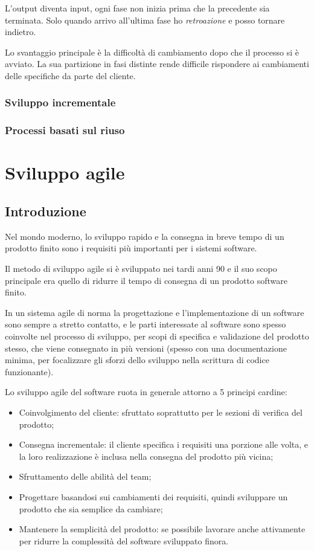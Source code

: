 \documentclass[a4paper, 10pt]{article}
\begin{document}
				L'output diventa input, ogni fase non inizia prima che la precedente sia terminata. Solo quando arrivo all'ultima fase ho \textit{retroazione} e posso tornare indietro.
				
				\noindent
				Lo svantaggio principale è la difficoltà di cambiamento dopo che il processo si è avviato.
				La sua partizione in fasi distinte rende difficile rispondere ai cambiamenti delle specifiche da parte del cliente.
				
			\subsubsection{Sviluppo incrementale}
			\subsubsection{Processi basati sul riuso}

	
	\section{Sviluppo agile}
		\subsection{Introduzione}
		Nel mondo moderno, lo sviluppo rapido e la consegna in breve tempo di un prodotto finito sono i requisiti più importanti per i sistemi software.
		
		Il metodo di sviluppo agile si è sviluppato nei tardi anni 90 e il suo scopo principale era quello di ridurre il tempo di consegna di un prodotto software finito. 
		
		In un sistema agile di norma la progettazione e l'implementazione di un software sono sempre a stretto contatto, e le parti interessate al software sono spesso coinvolte nel processo di sviluppo, per scopi di specifica e validazione del prodotto stesso, che viene consegnato in più versioni (spesso con una documentazione minima, per focalizzare gli sforzi dello sviluppo nella scrittura di codice funzionante).
		
		Lo sviluppo agile del software ruota in generale attorno a 5 principi cardine:
		\begin{itemize}
			\item Coinvolgimento del cliente: sfruttato soprattutto per le sezioni di verifica del prodotto;
			
			\item Consegna incrementale: il cliente specifica i requisiti una porzione alle volta, e la loro realizzazione è inclusa nella consegna del prodotto più vicina;
			
			\item Sfruttamento delle abilità del team;
			
			\item Progettare basandosi sui cambiamenti dei requisiti, quindi sviluppare un prodotto che sia semplice da cambiare;
			
			\item Mantenere la semplicità del prodotto: se possibile lavorare anche attivamente per ridurre la complessità del software sviluppato finora.
		\end{itemize}
	
\end{document}
